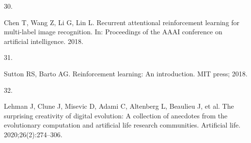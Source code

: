 \documentclass[
  10pt,
]{scrbook}
\newlength{\cslhangindent}
\newlength{\csllabelwidth}
\newlength{\cslentryspacingunit} %
\newenvironment{CSLReferences}[2] %
 {%
  \setlength{\parindent}{0pt}
  \ifodd #1
  \let\oldpar\par
  \def\par{\hangindent=\cslhangindent\oldpar}
  \fi
  \setlength{\parskip}{#2\cslentryspacingunit}
 }%
 {}
\newcommand{\CSLLeftMargin}[1]{\parbox[t]{\csllabelwidth}{#1}}
\newcommand{\CSLRightInline}[1]{\parbox[t]{\linewidth - \csllabelwidth}{#1}\break}
\begin{document}
\begin{CSLReferences}{0}{0}
\leavevmode{}%
\CSLLeftMargin{30. }
\CSLRightInline{Chen T, Wang Z, Li G, Lin L. Recurrent attentional reinforcement learning for multi-label image recognition. In: Proceedings of the AAAI conference on artificial intelligence. 2018. }

\leavevmode{}%
\CSLLeftMargin{31. }
\CSLRightInline{Sutton RS, Barto AG. Reinforcement learning: An introduction. MIT press; 2018. }

\leavevmode{}%
\CSLLeftMargin{32. }
\CSLRightInline{Lehman J, Clune J, Misevic D, Adami C, Altenberg L, Beaulieu J, et al. The surprising creativity of digital evolution: A collection of anecdotes from the evolutionary computation and artificial life research communities. Artificial life. 2020;26(2):274--306. }

\end{CSLReferences}

\printindex
\thispagestyle{empty}
\end{document}
